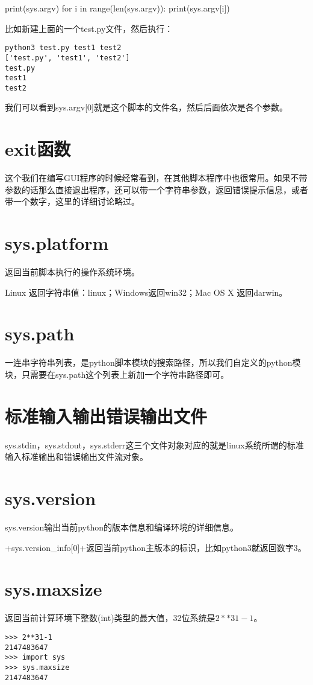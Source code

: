 \documentclass[12pt,oneside]{book}
\begin{document}
\begin{common-format}
\begin{tcbpython}
print(sys.argv)
for i in range(len(sys.argv)):
    print(sys.argv[i])
\end{tcbpython}
比如新建上面的一个test.py文件，然后执行：
\begin{Verbatim}
python3 test.py test1 test2
['test.py', 'test1', 'test2']
test.py
test1
test2
\end{Verbatim}
我们可以看到sys.argv[0]就是这个脚本的文件名，然后后面依次是各个参数。

\section{exit函数}
这个我们在编写GUI程序的时候经常看到，在其他脚本程序中也很常用。如果不带参数的话那么直接退出程序，还可以带一个字符串参数，返回错误提示信息，或者带一个数字，这里的详细讨论略过。


\section{sys.platform}
返回当前脚本执行的操作系统环境。

Linux 返回字符串值：linux；Windows返回win32；Mac OS X 返回darwin。

\section{sys.path}
一连串字符串列表，是python脚本模块的搜索路径，所以我们自定义的python模块，只需要在sys.path这个列表上新加一个字符串路径即可。

\section{标准输入输出错误输出文件}
sys.stdin，sys.stdout，sys.stderr这三个文件对象对应的就是linux系统所谓的标准输入标准输出和错误输出文件流对象。

\section{sys.version}
sys.version输出当前python的版本信息和编译环境的详细信息。

+sys.version_info[0]+返回当前python主版本的标识，比如python3就返回数字3。

\section{sys.maxsize}
返回当前计算环境下整数(int)类型的最大值，32位系统是$2**31-1$。
\begin{Verbatim}
>>> 2**31-1
2147483647
>>> import sys
>>> sys.maxsize
2147483647
\end{Verbatim}





\end{common-format}
\end{document}

